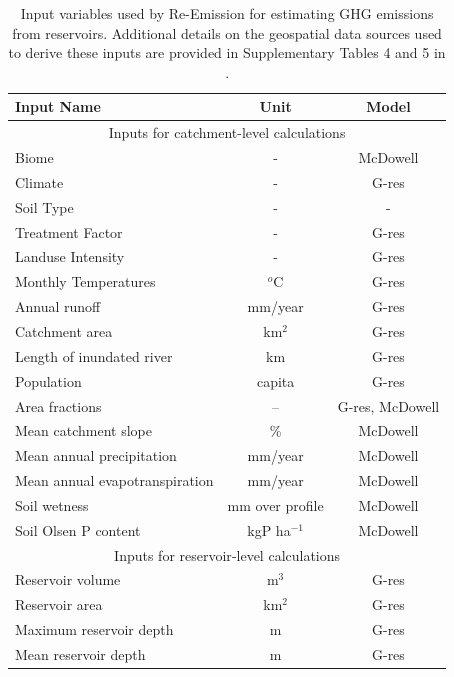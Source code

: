 \documentclass[review, authoryear, 1p]{elsarticle} %
\begin{document}
\begin{table}[ht]
\begin{threeparttable}
    \label{app_table:input_variables}
	{\small
    \caption{Input variables used by Re-Emission for estimating \ac{GHG} emissions from reservoirs. Additional details on the geospatial data sources used to derive these inputs are provided in Supplementary Tables 4 and 5 in \citet{janus2025planning}.}
    \label{app_table:input_variables}%
    \begin{tabular*}{\linewidth}{@{\extracolsep{\fill}}lcc@{}}
    \toprule
    Input Name & Unit & Model\tnote{2} \\
    \midrule%
    \multicolumn{3}{c}{Inputs for catchment{-}level calculations}\\%
    Biome&{-} & McDowell\tnote{3}\\%
    Climate&{-} & G-res\\%
    Soil Type&{-} & -\tnote{4}\\%
    Treatment Factor&{-} & G-res\\%
    Landuse Intensity&{-} & G-res\\%
    Monthly Temperatures&$^o$C & G-res\\%
    Annual runoff&mm/year & G-res\\%
    Catchment area&km$^2$ & G-res\\%
    Length of inundated river&km & G-res\\%
    Population&capita & G-res\\%
    Area fractions\tnote{1}&--& G-res, McDowell\tnote{3}\\%
    Mean catchment slope&\%& McDowell\tnote{3}\\%
    Mean annual precipitation&mm/year& McDowell\tnote{3}\\%
    Mean annual evapotranspiration&mm/year& McDowell\tnote{3}\\%
    Soil wetness&mm over profile& McDowell\tnote{3}\\%
    Soil Olsen P content&kgP ha$^{-1}$& McDowell\tnote{3}\\%
    \midrule%
    \multicolumn{3}{c}{Inputs for reservoir{-}level calculations}\\%
    Reservoir volume&m$^3$& G-res\\%
    Reservoir area&km$^2$& G-res\\%
    Maximum reservoir depth&m& G-res\\%
    Mean reservoir depth&m& G-res\\%

\end{tabular*}}
\end{threeparttable}
\end{table}
\end{document}
